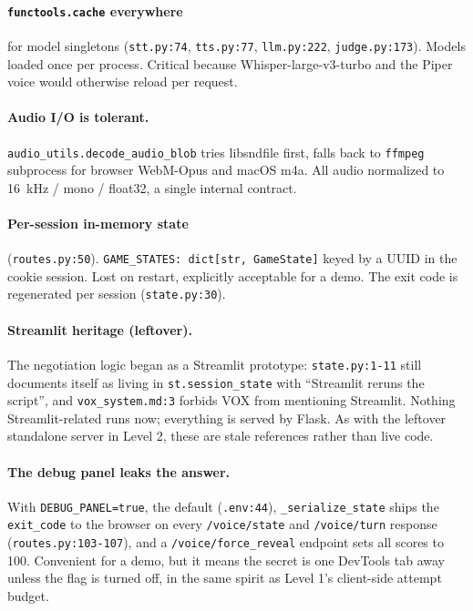 \documentclass[11pt,a4paper]{article}
\begin{document}
\paragraph{\texttt{functools.cache} everywhere} for model singletons
(\texttt{stt.py:74}, \texttt{tts.py:77}, \texttt{llm.py:222},
\texttt{judge.py:173}). Models loaded once per process. Critical because
Whisper-large-v3-turbo and the Piper voice would otherwise reload per request.

\paragraph{Audio I/O is tolerant.}
\texttt{audio\_utils.decode\_audio\_blob} tries libsndfile first, falls back to
\texttt{ffmpeg} subprocess for browser WebM-Opus and macOS m4a. All audio
normalized to 16~kHz / mono / float32, a single internal contract.

\paragraph{Per-session in-memory state} (\texttt{routes.py:50}).
\texttt{GAME\_STATES: dict[str, GameState]} keyed by a UUID in the cookie
session. Lost on restart, explicitly acceptable for a demo. The exit code is
regenerated per session (\texttt{state.py:30}).

\paragraph{Streamlit heritage (leftover).} The negotiation logic began as a
Streamlit prototype: \texttt{state.py:1-11} still documents itself as living in
\texttt{st.session\_state} with ``Streamlit reruns the script'', and
\texttt{vox\_system.md:3} forbids VOX from mentioning Streamlit. Nothing
Streamlit-related runs now; everything is served by Flask. As with the leftover
standalone server in Level 2, these are stale references rather than live code.

\paragraph{The debug panel leaks the answer.} With \texttt{DEBUG\_PANEL=true},
the default (\texttt{.env:44}), \texttt{\_serialize\_state} ships the
\texttt{exit\_code} to the browser on every \texttt{/voice/state} and
\texttt{/voice/turn} response (\texttt{routes.py:103-107}), and a
\texttt{/voice/force\_reveal} endpoint sets all scores to 100. Convenient for a
demo, but it means the secret is one DevTools tab away unless the flag is turned
off, in the same spirit as Level 1's client-side attempt budget.
\end{document}
